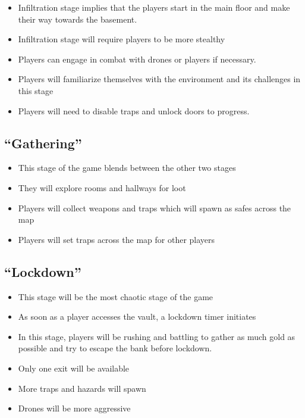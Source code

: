 \documentclass[10pt]{report}
\begin{document}
\begin{itemize}
    \item Infiltration stage implies that the players start in the main floor and make their way towards the basement.
    \item Infiltration stage will require players to be more stealthy
    \item Players can engage in combat with drones or players if necessary.
    \item Players will familiarize themselves with the environment and its challenges in this stage
    \item Players will need to disable traps and unlock doors to progress.
\end{itemize}

\subsection{``Gathering''}

\begin{itemize}
    \item This stage of the game blends between the other two stages
    \item They will explore rooms and hallways for loot
    \item Players will collect weapons and traps which will spawn as safes across the map
    \item Players will set traps across the map for other players    
\end{itemize}

\subsection{``Lockdown''}

\begin{itemize}
    \item This stage will be the most chaotic stage of the game
    \item As soon as a player accesses the vault, a lockdown timer initiates
    \item In this stage, players will be rushing and battling to gather as much gold as possible and try to escape the bank before lockdown.
    \item Only one exit will be available
    \item More traps and hazards will spawn
    \item Drones will be more aggressive
\end{itemize}
\end{document}

